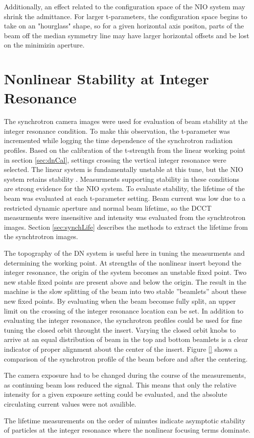 Additionally, an effect related to the configuration space of the NIO system may shrink the admittance. For larger t-parameters, the configuration space begins to take on an "hourglass" shape, so for a given horizontal axis positon, parts of the beam off the median symmetry line may have larger horizontal offsets and be lost on the minimizin aperture.

\section{Nonlinear Stability at Integer Resonance} \label{sec:intCross}
The synchrotron camera images were used for evaluation of beam stability at the integer resonance condition. To make this observation, the t-parameter was incremented while logging the time dependence of the synchrotron radiation profiles. Based on the calibration of the t-strength from the linear working point in section \ref{sec:dnCal}, settings crossing the vertical integer resonance were selected. The linear system is fundamentally unstable at this tune, but the NIO system retains stability . Measurments supporting stability in these conditions are strong evidence for the NIO system. To evaluate stability, the lifetime of the beam was evaluated at each t-parameter setting. Beam current was low due to a restricted dynamic aperture and normal beam lifetime, so the DCCT measurments were insensitive and intensity was evaluated from the synchtrotron images. Section \ref{sec:synchLife} describes the methods to extract the lifetime from the synchtrotron images.

The topography of the DN system is useful here in tuning the measurments and determining the working point. At strengths of the nonlinear insert beyond the integer resonance, the origin of the system becomes an unstable fixed point. Two new stable fixed points are present above and below the origin. The result in the machine is the slow splitting of the beam into two stable ”beamlets” about these new fixed points. By evaluating when the beam becomse fully split, an upper limit on the crossing of the integer resonance location can be set. In addition to evaluating the integer resonance, the synchrotron profiles could be used for fine tuning the closed orbit throught the insert. Varying the closed orbit knobs to arrive at an equal distribution of beam in the top and bottom beamlets is a  clear indicator of proper alignment about the center of the insert. Figure \ref{} shows a comparison of the synchrotron profile of the beam before and after the centering.

The camera exposure had to be changed during the course of the measurements, as continuing beam loss reduced the signal. This means that only the relative intensity for a given exposure setting could be evaluated, and the absolute circulating current values were not availible. 

The lifetime measurements on the order of minutes indicate asymptotic stability of particles at the integer resonance where the nonlinear focusing terms dominate.
